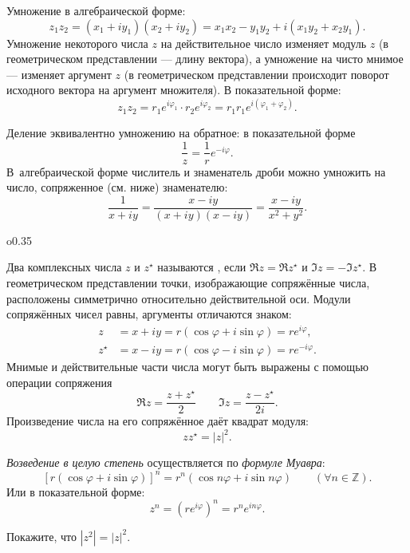 \begin{labsupplement}
    Умножение в алгебраической форме:
    \[
     z_1 z_2 = (x_1 +iy_1)(x_2 + iy_2) = x_1 x_2 - y_1 y_2 + i(x_1y_2 + x_2 y_1).
    \]
    Умножение некоторого числа $z$ на действительное число изменяет модуль
    $z$ (в геометрическом представлении --- длину вектора), а умножение
    на чисто мнимое --- изменяет аргумент $z$ (в геометрическом представлении
    происходит поворот исходного вектора на аргумент множителя). В показательной форме:
    \[
     z_1 z_2 = r_1 e^{i\varphi_1} \cdot r_2 e^{i\varphi_2} = r_1r_1 e^{i(\varphi_1+\varphi_2)}.
    \]


    Деление эквивалентно умножению на обратное: в показательной
    форме
    \[
      \frac{1}{z} = \frac{1}{r} e^{-i\varphi}.
    \]
 В~алгебраической форме числитель и знаменатель дроби можно умножить на число,
 сопряженное (см. ниже) знаменателю:
    \[
     \frac{1}{x+iy} = \frac{x-iy}{(x+iy)(x-iy)}=\frac{x-iy}{x^2+y^2}.
    \]

    \begin{wrapfigure}[9]{o}{0.35\textwidth}
    \end{wrapfigure}

    Два комплексных числа $z$ и $z^{\star}$ называются
    , если
    $\Re z = \Re z^{\star}$ и $\Im z = - \Im z^{\star}$. В геометрическом
    представлении точки, изображающие сопряжённые числа, расположены симметрично
    относительно действительной оси. Модули сопряжённых чисел
    равны, аргументы отличаются знаком:
    \begin{equation*}
    \begin{aligned}
        z &= x + iy = r(\cos\varphi + i\sin\varphi) = re^{i\varphi}, \\
        z^{\star} &= x - iy = r(\cos\varphi - i\sin\varphi) = re^{- i\varphi}.
    \end{aligned}
    \end{equation*}
    Мнимые и действительные части числа могут быть выражены с помощью
    операции сопряжения
    \[
     \Re z = \frac{z+z^{\star}}{2}\qquad \Im z =\frac{z-z^{\star}}{2i}.
    \]
    Произведение числа на его сопряжённое даёт квадрат модуля:
    \[
     z z^{\star} = |z|^2.
    \]

    \emph{Возведение в целую степень} осуществляется по \emph{формуле Муавра}:
      \begin{equation*}
        \left[r(\cos\varphi + i\sin\varphi)\right]^{n} =
        r^{n}(\cos n\varphi + i\sin n\varphi)\qquad (\forall n\in \mathbb{Z}).
    \end{equation*}
    Или в показательной форме:
    \[
     z^n = (re^{i\varphi})^n = r^n e^{in\varphi}.
    \]
    \begin{lab:exercise}
     Покажите, что $|z^2| = |z|^2$.
    \end{lab:exercise}


\end{labsupplement}

